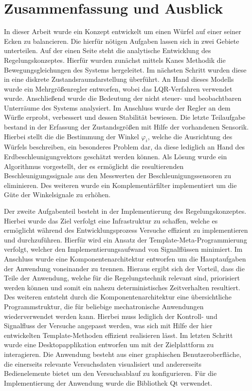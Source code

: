\chapter{Zusammenfassung und Ausblick}
In dieser Arbeit wurde ein Konzept entwickelt um einen Würfel auf einer seiner Ecken zu balancieren. Die hierfür nötigen Aufgaben lassen sich in zwei Gebiete unterteilen. Auf der einen Seite steht die analytische Entwicklung des Regelungskonzeptes. Hierfür wurden zunächst mittels Kanes Methodik die Bewegungsgleichungen des Systems hergeleitet. Im nächsten Schritt wurden diese in eine diskrete Zustandsraumdarstellung überführt. An Hand dieses Modells wurde ein Mehrgrößenregler entworfen, wobei das LQR-Verfahren verwendet wurde. Anschließend wurde die Bedeutung der nicht steuer- und beobachtbaren Unterräume des Systems analysiert. Im Anschluss wurde der Regler an dem Würfle erprobt, verbessert und dessen Stabilität bewiesen.
Die letzte Teilaufgabe bestand in der Erfassung der Zustandsgrößen mit Hilfe der vorhandenen Sensorik. Hierbei stellt die die Bestimmung der Winkel $\varphi_i$, welche die Ausrichtung des Würfels beschreiben, ein besonderes Problem dar, da diese lediglich an Hand des Erdbeschleunigungvektors geschätzt werden können. Als Lösung wurde ein Algorithmus vorgestellt, der es ermöglicht die resultierenden Beschleunigungssignale aus den Messwerten der Beschleunigungssensoren zu eliminieren. Des weiteren wurde ein Komplementärfilter implementiert um die Güte der Winkelsignale zu erhöhen.

Der zweite Aufgabenteil besteht in der Implementierung des Regelungskonzeptes. Hierbei wurde das Ziel verfolgt eine Infrastruktur zu schaffen, welche es ermöglicht während des Entwicklungsprozess Versuche effizient zu implementieren und durchzuführen. Hierfür wird ein Ansatz der Template-Meta-Programmierung verfolgt, welcher den Implementierungsaufwand von Signalflüssen minimiert. Im Anschluss wurde eine Komponentenarchitektur entworfen um die Hauptaufgaben der Anwendung voneinander zu trennen. Hieraus ergibt sich der Vorteil, dass die Teile der Anwendung, welche für die Regelungstechnik relevant sind, priorisiert werden können und somit ein nahezu deterministisches Zeitverhalten resultiert. Des weiteren entsteht durch die Komponentenarchitektur eine übersichtliche Programmstruktur, die für beliebige mechatronische Anwendungen wiederverwendet werden kann. Hierbei muss lediglich der Kontroll- und Signalfluss der Versuche angepasst werden, was sich mit Hilfe der hier entwickelten Template-Methoden effizient realisieren lässt. Im letzten Schritt wurde eine Desktopapplikation entworfen um mit der Zielplattform zu interagieren. Die Anwendung besteht aus einer graphischen Benutzeroberfläche, die einerseits relevante Versuchsdaten visualisiert und andererseits Bedienelemente bietet um den Versuchsablauf zu konfigurieren. Für die Implementierung der Anwendung wurde die Bibliothek Qt verwendet.

